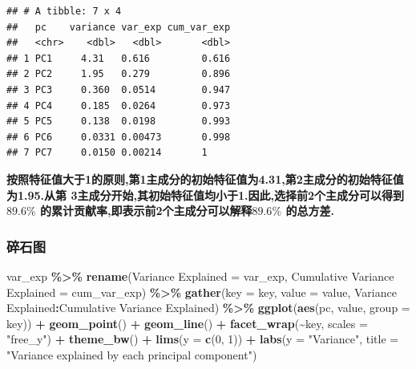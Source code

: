 \documentclass[
]{article}
\newenvironment{Shaded}{\begin{snugshade}}{\end{snugshade}}
\newcommand{\AttributeTok}[1]{\textcolor[rgb]{0.13,0.29,0.53}{#1}}
\newcommand{\DecValTok}[1]{\textcolor[rgb]{0.00,0.00,0.81}{#1}}
\newcommand{\FunctionTok}[1]{\textcolor[rgb]{0.13,0.29,0.53}{\textbf{#1}}}
\newcommand{\NormalTok}[1]{#1}
\newcommand{\OtherTok}[1]{\textcolor[rgb]{0.56,0.35,0.01}{#1}}
\newcommand{\SpecialCharTok}[1]{\textcolor[rgb]{0.81,0.36,0.00}{\textbf{#1}}}
\newcommand{\StringTok}[1]{\textcolor[rgb]{0.31,0.60,0.02}{#1}}
\begin{document}
\begin{verbatim}
## # A tibble: 7 x 4
##   pc    variance var_exp cum_var_exp
##   <chr>    <dbl>   <dbl>       <dbl>
## 1 PC1     4.31   0.616         0.616
## 2 PC2     1.95   0.279         0.896
## 3 PC3     0.360  0.0514        0.947
## 4 PC4     0.185  0.0264        0.973
## 5 PC5     0.138  0.0198        0.993
## 6 PC6     0.0331 0.00473       0.998
## 7 PC7     0.0150 0.00214       1
\end{verbatim}

\textbf{按照特征值大于1的原则,第1主成分的初始特征值为4.31,第2主成分的初始特征值为1.95.从第
3主成分开始,其初始特征值均小于1.因此,选择前2个主成分可以得到\(89.6\%\)
的累计贡献率,即表示前2个主成分可以解释\(89.6\%\) 的总方差.}

\subsubsection{碎石图}\label{ux788eux77f3ux56fe}

\begin{Shaded}
\begin{Highlighting}[]
\NormalTok{var\_exp }\SpecialCharTok{\%\textgreater{}\%} 
  \FunctionTok{rename}\NormalTok{(}\StringTok{\textasciigrave{}}\AttributeTok{Variance Explained}\StringTok{\textasciigrave{}} \OtherTok{=}\NormalTok{ var\_exp,}
         \StringTok{\textasciigrave{}}\AttributeTok{Cumulative Variance Explained}\StringTok{\textasciigrave{}} \OtherTok{=}\NormalTok{ cum\_var\_exp) }\SpecialCharTok{\%\textgreater{}\%} 
  \FunctionTok{gather}\NormalTok{(}\AttributeTok{key =}\NormalTok{ key, }\AttributeTok{value =}\NormalTok{ value, }\StringTok{\textasciigrave{}}\AttributeTok{Variance Explained}\StringTok{\textasciigrave{}}\SpecialCharTok{:}\StringTok{\textasciigrave{}}\AttributeTok{Cumulative Variance Explained}\StringTok{\textasciigrave{}}\NormalTok{) }\SpecialCharTok{\%\textgreater{}\%} 
  \FunctionTok{ggplot}\NormalTok{(}\FunctionTok{aes}\NormalTok{(pc, value, }\AttributeTok{group =}\NormalTok{ key)) }\SpecialCharTok{+} 
  \FunctionTok{geom\_point}\NormalTok{() }\SpecialCharTok{+} 
  \FunctionTok{geom\_line}\NormalTok{() }\SpecialCharTok{+} 
  \FunctionTok{facet\_wrap}\NormalTok{(}\SpecialCharTok{\textasciitilde{}}\NormalTok{key, }\AttributeTok{scales =} \StringTok{"free\_y"}\NormalTok{) }\SpecialCharTok{+}
  \FunctionTok{theme\_bw}\NormalTok{() }\SpecialCharTok{+}
  \FunctionTok{lims}\NormalTok{(}\AttributeTok{y =} \FunctionTok{c}\NormalTok{(}\DecValTok{0}\NormalTok{, }\DecValTok{1}\NormalTok{)) }\SpecialCharTok{+}
  \FunctionTok{labs}\NormalTok{(}\AttributeTok{y =} \StringTok{"Variance"}\NormalTok{,}
       \AttributeTok{title =} \StringTok{"Variance explained by each principal component"}\NormalTok{)}
\end{Highlighting}
\end{Shaded}
\end{document}
